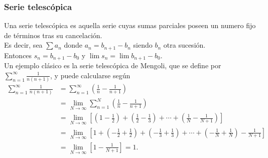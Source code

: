 \documentclass[10pt]{article}
\theoremstyle{definition}
\begin{document}
\subsubsection{Serie telescópica}
Una serie telescópica es aquella serie cuyas sumas parciales poseen un numero fijo de términos tras su cancelación.\\
Es decir, sea $\sum a_n$ donde $a_n=b_{n+1}-b_n$ siendo $b_n$ otra sucesión.\\
Entonces $s_n=b_{n+1}-b_0$ y $\lim s_n=\lim b_{n+1}-b_0$.\\
Un ejemplo clásico es la serie telescópica de Mengoli, que se define por $\sum_{n=1}^{\infty} \frac{1}{n(n+1)}$, y puede calcularse según
$$\begin{aligned}\sum _{n=1}^{\infty }{\frac {1}{n(n+1)}}                                                                                                                                                                                                   & {}=\sum _{n=1}^{\infty }\left({\frac {1}{n}}-{\frac {1}{n+1}}\right)\\{} & {}
               =\lim _{N\to \infty }\sum _{n=1}^{N}\left({\frac {1}{n}}-{\frac {1}{n+1}}\right)\\{}                                                                                                                                 & {}
               =\lim _{N\to \infty }\left\lbrack {\left(1-{\frac {1}{2}}\right)+\left({\frac {1}{2}}-{\frac {1}{3}}\right)+\cdots +\left({\frac {1}{N}}-{\frac {1}{N+1}}\right)}\right\rbrack \\{}                                  & {}
               =\lim _{N\to \infty }\left\lbrack {1+\left(-{\frac {1}{2}}+{\frac {1}{2}}\right)+\left(-{\frac {1}{3}}+{\frac {1}{3}}\right)+\cdots +\left(-{\frac {1}{N}}+{\frac {1}{N}}\right)-{\frac {1}{N+1}}}\right\rbrack \\{} & {}
               =\lim _{N\to \infty }\left\lbrack {1-{\frac {1}{N+1}}}\right\rbrack =1.\end{aligned}$$
\end{document}
